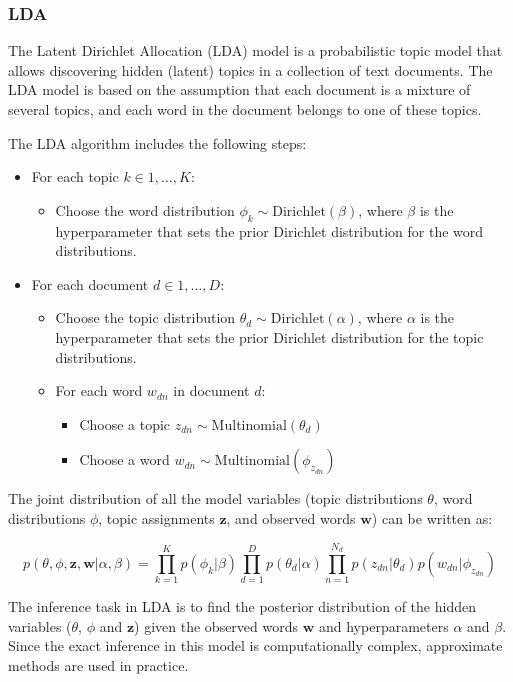 \subsubsection{LDA}
The Latent Dirichlet Allocation (LDA) model is a probabilistic topic model that allows discovering hidden (latent) topics in a collection of text documents. The LDA model is based on the assumption that each document is a mixture of several topics, and each word in the document belongs to one of these topics.

The LDA algorithm includes the following steps:
\begin{itemize}
\item For each topic $k \in {1, \ldots, K}$:
\begin{itemize}
\item Choose the word distribution $\phi_k \sim \mathrm{Dirichlet}(\beta)$, where  $\beta$ is the hyperparameter that sets the prior Dirichlet distribution for the word distributions.
\end{itemize}
\item For each document $d \in {1, \ldots, D}$:
\begin{itemize}
\item Choose the topic distribution $\theta_d \sim \mathrm{Dirichlet}(\alpha)$, where  $\alpha$ is the hyperparameter that sets the prior Dirichlet distribution for the topic distributions.
\item For each word $w_{dn}$ in document $d$:
\begin{itemize}
\item Choose a topic $z_{dn} \sim \mathrm{Multinomial}(\theta_d)$
\item Choose a word $w_{dn} \sim \mathrm{Multinomial}(\phi_{z_{dn}})$
\end{itemize}
\end{itemize}
\end{itemize}

The joint distribution of all the model variables (topic distributions $\theta$, word distributions $\phi$, topic assignments $\mathbf{z}$, and observed words $\mathbf{w}$) can be written as:

\begin{equation}
p(\theta, \phi, \mathbf{z}, \mathbf{w} | \alpha, \beta) = \prod_{k=1}^K p(\phi_k | \beta) \prod_{d=1}^D p(\theta_d | \alpha) \prod_{n=1}^{N_d} p(z_{dn} | \theta_d) p(w_{dn} | \phi_{z_{dn}})
\end{equation}

The inference task in LDA is to find the posterior distribution of the hidden variables ($\theta$, $\phi$ and $\mathbf{z}$) given the observed words $\mathbf{w}$ and hyperparameters $\alpha$ and $\beta$. Since the exact inference in this model is computationally complex, approximate methods are used in practice.

